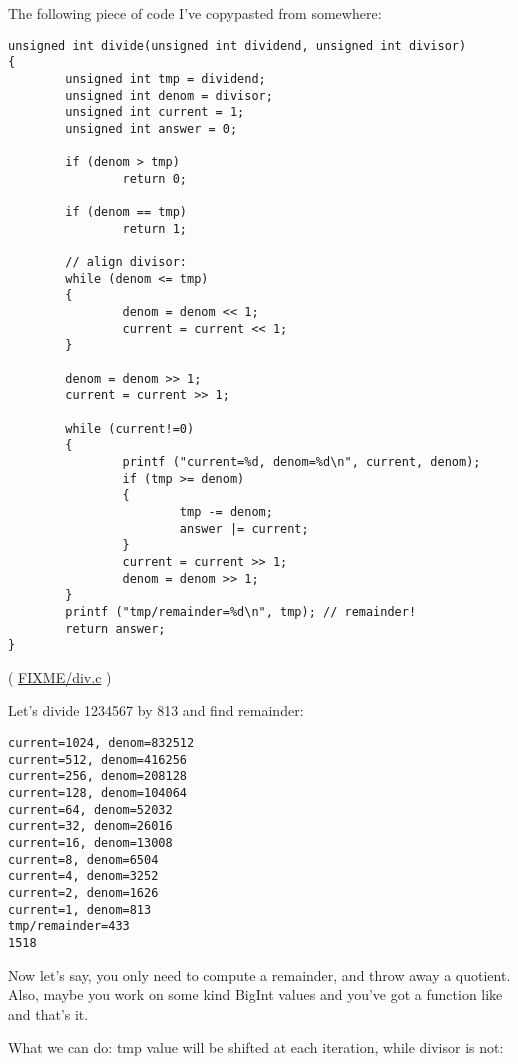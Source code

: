 The following piece of code I've copypasted from somewhere:

\begin{lstlisting}[style=customc]
unsigned int divide(unsigned int dividend, unsigned int divisor)
{
        unsigned int tmp = dividend;
        unsigned int denom = divisor;
        unsigned int current = 1;
        unsigned int answer = 0;

        if (denom > tmp)
                return 0;

        if (denom == tmp)
                return 1;

        // align divisor:
        while (denom <= tmp)
        {
                denom = denom << 1;
                current = current << 1;
        }

        denom = denom >> 1;
        current = current >> 1;

        while (current!=0)
        {
                printf ("current=%d, denom=%d\n", current, denom);
                if (tmp >= denom)
                {
                        tmp -= denom;
                        answer |= current;
                }
                current = current >> 1;
                denom = denom >> 1;
        }
        printf ("tmp/remainder=%d\n", tmp); // remainder!
        return answer;
}
\end{lstlisting}

( \url{FIXME/div.c} )

Let's divide 1234567 by 813 and find remainder:

\begin{lstlisting}
current=1024, denom=832512
current=512, denom=416256
current=256, denom=208128
current=128, denom=104064
current=64, denom=52032
current=32, denom=26016
current=16, denom=13008
current=8, denom=6504
current=4, denom=3252
current=2, denom=1626
current=1, denom=813
tmp/remainder=433
1518
\end{lstlisting}


Now let's say, you only need to compute a remainder, and throw away a quotient.
Also, maybe you work on some kind BigInt values and you've got a function like  and that's it.

What we can do: tmp value will be shifted at each iteration, while divisor is not:

